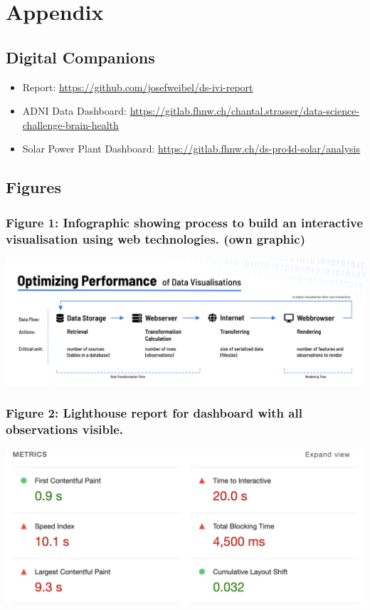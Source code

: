 \documentclass[11pt]{article}
\begin{document}
\pagebreak
\section{Appendix}

\subsection{Digital Companions}

\begin{itemize}
    \item Report: \url{https://github.com/josefweibel/ds-ivi-report}

    \item ADNI Data Dashboard: \url{https://gitlab.fhnw.ch/chantal.strasser/data-science-challenge-brain-health}

    \item Solar Power Plant Dashboard: \url{https://gitlab.fhnw.ch/ds-pro4d-solar/analysis}
\end{itemize}

\subsection{Figures}

\subsubsection{Figure 1: Infographic showing process to build an interactive visualisation using web technologies. (own graphic)}
\includegraphics{./performance.png}

\subsubsection{Figure 2: Lighthouse report for dashboard with all observations visible.}
\includegraphics{./lighthouse-1.png}
\end{document}
